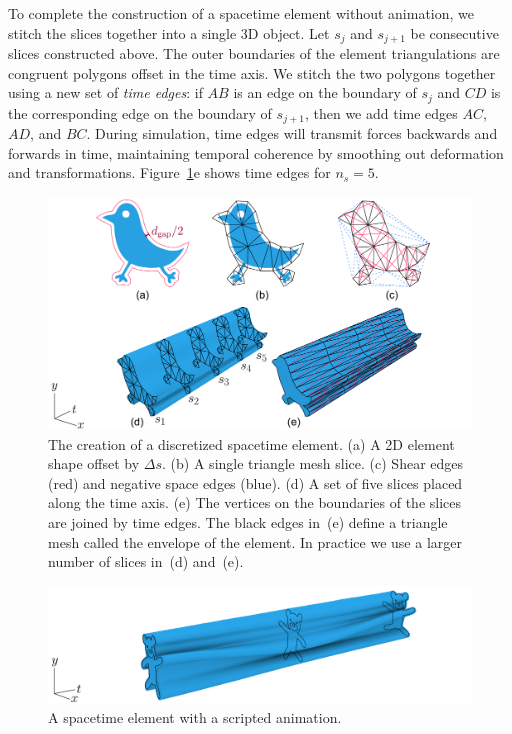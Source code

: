To complete the construction of a spacetime element without animation,
we stitch the slices together into a single 3D object.  Let $s_j$ and
$s_{j+1}$ be consecutive slices constructed above.  The outer boundaries
of the element triangulations are congruent polygons offset in the time 
axis.  We stitch the two polygons together using a new set of 
\textit{time edges}: if $AB$ is an edge on the boundary of $s_j$ and
$CD$ is the corresponding edge on the boundary of $s_{j+1}$, then
we add time edges $AC$, $AD$, and $BC$.
During simulation, time edges will transmit forces backwards and forwards in
time, maintaining temporal coherence by smoothing out deformation and 
transformations.
Figure~\ref{fig_animationpak_discretization}e shows time edges for $n_s=5$.

\begin{figure}
\centering
\includegraphics[width=1.0\textwidth]{figures/animationpak/discretization.pdf} 
\caption[The creation of a discretized spacetime element]
{\label{fig_animationpak_discretization} 
The creation of a discretized spacetime element.  
(a) A 2D element shape offset by $\Delta s$.
(b) A single triangle mesh slice.
(c) Shear edges (red) and negative space edges (blue).
(d) A set of five slices placed along the time axis.
(e) The vertices on the boundaries of the slices are joined by 
  time edges.  The black edges in~(e) define a triangle mesh
  called the envelope of the element.
  In practice we use a larger number of slices in~(d) and~(e).
}
\end{figure}

\begin{figure}
\centering
\includegraphics[width=1.0\textwidth]{figures/animationpak/spacetime_element.pdf} 
\caption[A spacetime element with a scripted animation]
{\label{fig_animationpak_spacetime_element} 
A spacetime element with a scripted animation.}
\end{figure}


